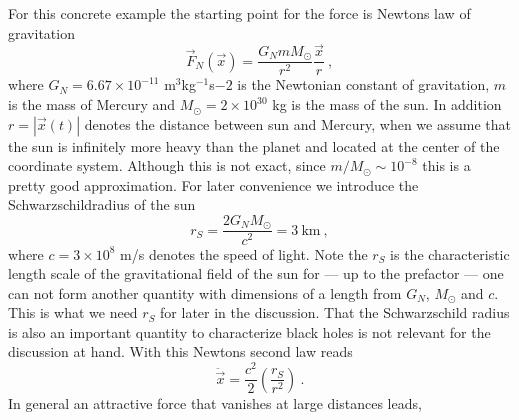 \documentclass[12pt]{iopart}
\begin{document}
For this concrete example the starting point for the force is Newtons law
of gravitation
\begin{equation}
\vec F_N(\vec x) = \frac{G_N m M_\odot}{r^2} \frac{\vec x}{r}\ ,
\end{equation}
where $G_N=6.67\times 10^{-11}$ m$^3$kg$^{-1}$s${-2}$ is the Newtonian constant of gravitation,
$m$ is the mass of Mercury and $M_\odot=2\times 10^{30}$ kg is the mass of the sun.
In addition $r=|\vec x(t)|$ denotes the distance between sun and Mercury, when we assume that the sun
is infinitely more heavy than the planet and located at the center of the coordinate system. 
Although this is not exact, since $m/M_\odot\sim 10^{-8}$ this is a pretty good approximation.
%
%
For later convenience we introduce the Schwarzschildradius of the sun
\begin{equation}
r_S=\frac{2G_N  M_\odot}{c^2} = 3 \ \mbox{km} \ ,
\end{equation}
where $c=3\times 10^8$ m/s denotes the speed of light.
Note the $r_S$ is the characteristic length scale of the gravitational field of the sun
for --- up to the prefactor --- one can not form another quantity with dimensions of a length from $G_N$, $M_\odot$ and
$c$. This is what we need $r_S$ for later in the discussion. That the Schwarzschild radius is
also an important quantity to characterize black holes is not relevant for the discussion
at hand.
With this Newtons second law reads 
\begin{equation}
\ddot{\vec x} = \frac{c^2}{2}\left(\frac{r_S}{r^2}\right) \ .
\label{eq:newton}
\end{equation}
In general an attractive force that vanishes at large distances leads,
%
\end{document}
